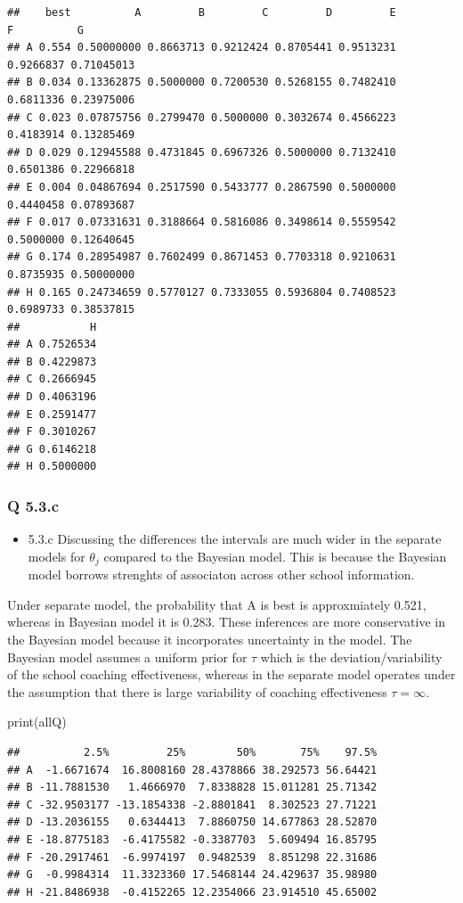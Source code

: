 \documentclass[
]{book}
\newenvironment{Shaded}{\begin{snugshade}}{\end{snugshade}}
\newcommand{\FunctionTok}[1]{\textcolor[rgb]{0.00,0.00,0.00}{#1}}
\newcommand{\NormalTok}[1]{#1}
\providecommand{\tightlist}{%
  \setlength{\itemsep}{0pt}\setlength{\parskip}{0pt}}
\theoremstyle{definition}
\theoremstyle{definition}
\theoremstyle{definition}
\theoremstyle{definition}
\theoremstyle{remark}
\begin{document}
\begin{verbatim}
##    best          A         B         C         D         E         F          G
## A 0.554 0.50000000 0.8663713 0.9212424 0.8705441 0.9513231 0.9266837 0.71045013
## B 0.034 0.13362875 0.5000000 0.7200530 0.5268155 0.7482410 0.6811336 0.23975006
## C 0.023 0.07875756 0.2799470 0.5000000 0.3032674 0.4566223 0.4183914 0.13285469
## D 0.029 0.12945588 0.4731845 0.6967326 0.5000000 0.7132410 0.6501386 0.22966818
## E 0.004 0.04867694 0.2517590 0.5433777 0.2867590 0.5000000 0.4440458 0.07893687
## F 0.017 0.07331631 0.3188664 0.5816086 0.3498614 0.5559542 0.5000000 0.12640645
## G 0.174 0.28954987 0.7602499 0.8671453 0.7703318 0.9210631 0.8735935 0.50000000
## H 0.165 0.24734659 0.5770127 0.7333055 0.5936804 0.7408523 0.6989733 0.38537815
##           H
## A 0.7526534
## B 0.4229873
## C 0.2666945
## D 0.4063196
## E 0.2591477
## F 0.3010267
## G 0.6146218
## H 0.5000000
\end{verbatim}

\hypertarget{q-5.3.c}{%
\subsubsection{Q 5.3.c}\label{q-5.3.c}}

\begin{itemize}
\tightlist
\item
  5.3.c
  Discussing the differences the intervals are much wider in the separate models for \(\theta_j\) compared to the Bayesian model. This is because the Bayesian model borrows strenghts of associaton across other school information.
\end{itemize}

Under separate model, the probability that A is best is approxmiately 0.521, whereas in Bayesian model it is 0.283. These inferences are more conservative in the Bayesian model because it incorporates uncertainty in the model. The Bayesian model assumes a uniform prior for \(\tau\) which is the deviation/variability of the school coaching effectiveness, whereas in the separate model operates under the assumption that there is large variability of coaching effectiveness \(\tau = \infty\).

\begin{Shaded}
\begin{Highlighting}[]
\FunctionTok{print}\NormalTok{(allQ)}
\end{Highlighting}
\end{Shaded}

\begin{verbatim}
##          2.5%         25%        50%       75%    97.5%
## A  -1.6671674  16.8008160 28.4378866 38.292573 56.64421
## B -11.7881530   1.4666970  7.8338828 15.011281 25.71342
## C -32.9503177 -13.1854338 -2.8801841  8.302523 27.71221
## D -13.2036155   0.6344413  7.8860750 14.677863 28.52870
## E -18.8775183  -6.4175582 -0.3387703  5.609494 16.85795
## F -20.2917461  -6.9974197  0.9482539  8.851298 22.31686
## G  -0.9984314  11.3323360 17.5468144 24.429637 35.98980
## H -21.8486938  -0.4152265 12.2354066 23.914510 45.65002
\end{verbatim}
\end{document}
